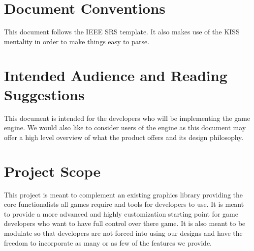 \documentclass{scrreprt}
\begin{document}

\section{Document Conventions}

This document follows the IEEE SRS template.  It also makes use of the KISS mentality in order to make things easy to parse.


\section{Intended Audience and Reading Suggestions}

This document is intended for the developers who will be implementing the game engine.  We would also like to consider users of the engine as this document may offer a high level overview of what the product offers and its design philosophy.


\section{Project Scope}

This project is meant to complement an existing graphics library providing the core functionalists all games require and tools for developers to use.  It is meant to provide a more advanced and highly customization starting point for game developers who want to have full control over there game.  It is also meant to be modulate so that developers are not forced into using our designs and have the freedom to incorporate as many or as few of the features we provide.
\end{document}
